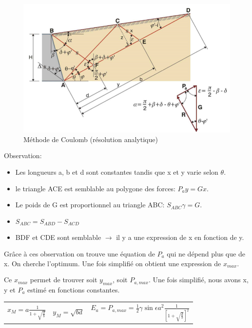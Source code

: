         \begin{figure}[h!]
            \centering
            \includegraphics[scale=1]{Holeyman/images/H48.PNG}
            \caption{ Méthode de Coulomb (résolution analytique) }
        \end{figure}
        
        Observation:
        \begin{itemize}
            \item Les longueurs a, b et d sont constantes tandis que x et y varie selon $\theta$.
            \item le triangle ACE est semblable au polygone des forces: $P_a y = G x$.
            \item Le poids de G est proportionnel au triangle ABC: $S_{ABC} \gamma = G$.
            \item $S_{ABC} = S_{ABD} - S_{ACD}$
            \item BDF et CDE sont semblable $\to$ il y a une expression de x en fonction de y.
        \end{itemize} 
        
        Grâce à ces observation on trouve une équation de $P_a$ qui ne dépend plus que de x. On cherche l'optimum. Une fois simplifié on obtient une expression de $x_{max}$.
        
        Ce $x_{max}$ permet de trouver soit $y_{max}$, soit $P_{a,max}$. Une fois simplifié, nous avons x, y et $P_a$ estimé en fonctions constantes.
        
        \begin{center}
        \begin{tabular}{ccc}
             $x_M = a \frac{1}{1+\sqrt{\frac{d}{b}}}$ \: \:
             & $y_M = \sqrt{bd}$ \: \: \:
             & $E_a = P_{a,max} = \frac{1}{2} \gamma \sin \epsilon a^2 \frac{1}{[1+\sqrt{\frac{d}{b}}]^2}$ 
        \end{tabular}
        \end{center} 
        
